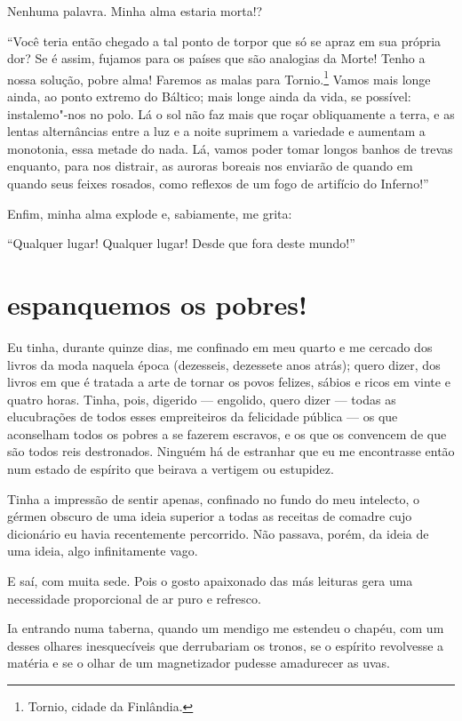 Nenhuma palavra. Minha alma estaria morta!?

“Você teria então chegado a tal ponto de torpor que só se
apraz em sua própria dor? Se é assim, fujamos para os países que são
analogias da Morte! Tenho a nossa solução, pobre alma! Faremos as
malas para Tornio.\protect\footnote{  Tornio, cidade da Finlândia.} Vamos mais longe ainda, ao ponto
extremo do Báltico; mais longe ainda da vida, se possível:
instalemo"-nos no polo. Lá o sol não faz mais que roçar obliquamente a terra, e as
lentas alternâncias entre a luz e a noite suprimem a variedade e aumentam a
monotonia, essa metade do nada. Lá, vamos poder tomar longos banhos de
trevas enquanto, para nos distrair, as auroras boreais nos
enviarão de quando em quando seus feixes rosados, como reflexos de um fogo
de artifício do Inferno!''

Enfim, minha alma explode e, sabiamente, me grita:

“Qualquer lugar! Qualquer lugar! Desde que fora deste
mundo!''

\quebra\section[Espanquemos os pobres!]{espanquemos os pobres!}

Eu tinha, durante quinze dias, me confinado em meu quarto e me cercado dos
livros da moda naquela época (dezesseis, dezessete anos atrás); quero dizer, dos
livros em que é tratada a arte de tornar os povos felizes, sábios e
ricos em vinte e quatro horas. Tinha, pois, digerido --- engolido,
quero dizer --- todas as elucubrações de todos esses empreiteiros da
felicidade pública --- os que aconselham todos os pobres a se
fazerem escravos, e os que os convencem de que são todos reis
destronados. Ninguém há de estranhar que eu me encontrasse então num
estado de espírito que beirava a vertigem ou estupidez.

Tinha a impressão de sentir apenas, confinado no fundo do meu intelecto, o
gérmen obscuro de uma ideia superior a todas as receitas de comadre 
cujo dicionário eu havia recentemente percorrido. Não passava, porém, da 
ideia de uma ideia, algo infinitamente vago.

E saí, com muita sede. Pois o gosto apaixonado das más leituras gera
uma necessidade proporcional de ar puro e refresco.

Ia entrando numa taberna, quando um mendigo me estendeu o chapéu, com
um desses olhares inesquecíveis que derrubariam os tronos, se o
espírito revolvesse a matéria e se o olhar de um magnetizador pudesse
amadurecer as uvas.

